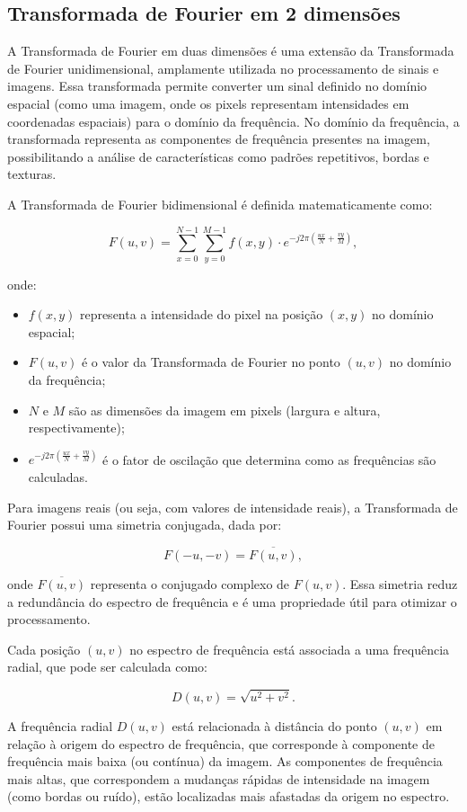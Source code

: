 \subsection{Transformada de Fourier em 2 dimensões}

A Transformada de Fourier em duas dimensões é uma extensão da Transformada de Fourier unidimensional, amplamente utilizada no processamento de sinais e imagens. Essa transformada permite converter um sinal definido no domínio espacial (como uma imagem, onde os pixels representam intensidades em coordenadas espaciais) para o domínio da frequência. No domínio da frequência, a transformada representa as componentes de frequência presentes na imagem, possibilitando a análise de características como padrões repetitivos, bordas e texturas.

A Transformada de Fourier bidimensional é definida matematicamente como:

$$
    F(u,v) = \sum_{x=0}^{N-1} \sum_{y=0}^{M-1} f(x,y) \cdot e^{-j 2\pi \left(\frac{ux}{N} + \frac{vy}{M}\right)},
$$

onde:
\begin{itemize}
    \item $f(x, y)$ representa a intensidade do pixel na posição $(x, y)$ no domínio espacial;
    \item $F(u, v)$ é o valor da Transformada de Fourier no ponto $(u, v)$ no domínio da frequência;
    \item $N$ e $M$ são as dimensões da imagem em pixels (largura e altura, respectivamente);
    \item $e^{-j 2\pi (\frac{ux}{N} + \frac{vy}{M})}$ é o fator de oscilação que determina como as frequências são calculadas.
\end{itemize}

Para imagens reais (ou seja, com valores de intensidade reais), a Transformada de Fourier possui uma simetria conjugada, dada por:

$$
    F(-u, -v) = \overline{F(u, v)},
$$

onde $\overline{F(u, v)}$ representa o conjugado complexo de $F(u, v)$. Essa simetria reduz a redundância do espectro de frequência e é uma propriedade útil para otimizar o processamento.

Cada posição $(u, v)$ no espectro de frequência está associada a uma frequência radial, que pode ser calculada como:

$$
    D(u, v) = \sqrt{u^2 + v^2}.
$$

A frequência radial $D(u, v)$ está relacionada à distância do ponto $(u, v)$ em relação à origem do espectro de frequência, que corresponde à componente de frequência mais baixa (ou contínua) da imagem. As componentes de frequência mais altas, que correspondem a mudanças rápidas de intensidade na imagem (como bordas ou ruído), estão localizadas mais afastadas da origem no espectro.

